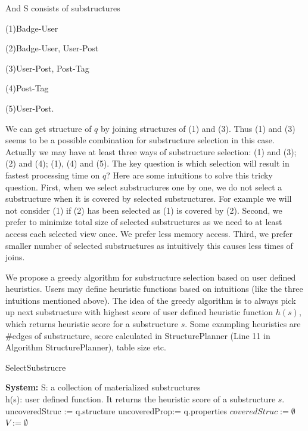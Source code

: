 And S consists of substructures 

(1)Badge-User

(2)Badge-User, User-Post 

(3)User-Post, Post-Tag

(4)Post-Tag

(5)User-Post.

We can get structure of $q$ by joining structures of (1) and (3). Thus (1) and (3) seems to be a possible combination for substructure selection in this case. Actually we may have at least three ways of substructure selection: (1) and (3); (2) and (4);
(1), (4) and (5). The key question is which selection will result in fastest processing time on $q$? Here are some intuitions to solve this tricky question. First, when we select substructures one by one, we do not select a substructure when it is covered by selected substructures. For example we will not consider (1) if (2) has been selected as (1) is covered by (2). Second, we prefer to minimize total size of selected substructures as we need to at least access each selected view once. We prefer less memory access. Third, we prefer smaller number of selected substructures as intuitively this causes less times of joins. 

We propose a greedy algorithm for substructure selection based on user defined heuristics. Users may define heuristic functions based on intuitions (like the three intuitions mentioned above). The idea of the greedy algorithm is to always pick up next substructure with highest score of user defined heuristic function $h(s)$, which returns heuristic score for a substructure $s$. Some exampling heuristics are \#edges of substructure, score calculated in StructurePlanner (Line 11 in Algorithm StructurePlanner), table size etc. 

\begin{algorithm}[H]
\caption{SelectSubstrucre}
\LinesNumbered
\textbf{System:} S: a collection of materialized substructures\\ h(s): user defined function. It returns the heuristic score of a substructure $s$.\\
uncoveredStruc := q.structure\;
uncoveredProp:= q.properties\; 
$coveredStruc:= \emptyset$\;
$V:=\emptyset $\;
\end{algorithm}

